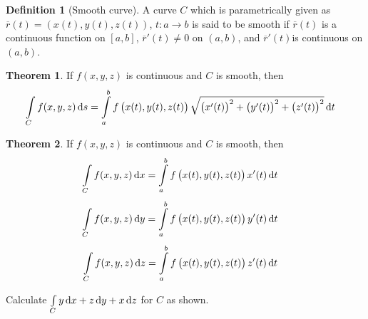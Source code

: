 \documentclass[fleqn, a4paper, 12pt, twoside]{article}
\theoremstyle{definition}
\newtheorem{definition}{Definition}
\theoremstyle{theorem}
\newtheorem{theorem}{Theorem}
\begin{document}
{\begin{definition}[Smooth curve]
	A curve $C$ which is parametrically given as $\overline{r}(t) = \left( x(t) , y(t) , z(t) \right)$, $t : a \to b$ is said to be smooth if $\overline{r}(t)$ is a continuous function on $[a,b]$, $\overline{r}'(t) \neq 0$ on $(a,b)$, and $\overline{r}'(t)$is continuous on $(a,b)$.
\end{definition}

\begin{theorem}
	If $f(x,y,z)$ is continuous and $C$ is smooth, then
	\begin{align*}
		\int\limits_{C} f(x,y,z) \dif s & = \int\limits_{a}^{b} f\left( x(t) , y(t), z(t) \right) \sqrt{\left( x'(t) \right)^2 + \left( y'(t) \right)^2 + \left( z'(t) \right)^2} \dif t
	\end{align*}
\end{theorem}

\begin{theorem}
	If $f(x,y,z)$ is continuous and $C$ is smooth, then
	\begin{align*}
		\int\limits_{C} f(x,y,z) \dif x & = \int\limits_{a}^{b} f\left( x(t) , y(t) , z(t) \right) x'(t) \dif t
	\end{align*}
	\begin{align*}
		\int\limits_{C} f(x,y,z) \dif y & = \int\limits_{a}^{b} f\left( x(t) , y(t) , z(t) \right) y'(t) \dif t
	\end{align*}
	\begin{align*}
		\int\limits_{C} f(x,y,z) \dif z & = \int\limits_{a}^{b} f\left( x(t) , y(t) , z(t) \right) z'(t) \dif t
	\end{align*}
\end{theorem}

\begin{question}
	Calculate $\int\limits_{C} y \dif x + z \dif y + x \dif z$ for $C$ as shown.
	\begin{figure}[H]
\end{figure}
\end{question}}
\end{document}
